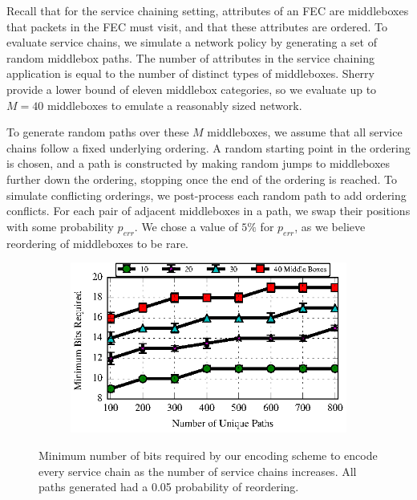 Recall that for the service chaining setting, attributes of an FEC are
middleboxes that packets in the FEC must visit, and that these
attributes are ordered. 
To evaluate service chains, we simulate a network policy by generating a
set of random middlebox paths. The number of attributes in the service
chaining application is equal to the number of distinct types of
middleboxes. Sherry \ea~\cite{Sherry:2012} provide a lower bound of eleven
middlebox categories, so we evaluate up to $M = 40$ middleboxes to
emulate a reasonably sized network.  

To generate random paths over these $M$ middleboxes, we assume that all
service chains follow a fixed underlying ordering. A random starting
point in the ordering is chosen, and a path is constructed by making
random jumps to middleboxes further down the ordering, stopping once the
end of the ordering is reached.  To simulate conflicting orderings, we
post-process each random path to add ordering conflicts. For each pair
of adjacent middleboxes in a path, we swap their positions with some
probability $p_{err}$. We chose a value of $5\%$ for $p_{err}$, as we
believe reordering of middleboxes to be rare.

\begin{figure}[t!] 
\begin{minipage}{1\linewidth}
\begin{subfigure}[b]{0.96\linewidth}
\includegraphics[width=\linewidth]{figures/service_chaining_minbits_ordered}
\end{subfigure} 
\end{minipage} 
\caption{Minimum number of bits required by our encoding scheme to
  encode every service chain as the number of service chains increases.
  All paths generated had a 0.05 probability of reordering.}
\label{fig:chain_bits}
\end{figure}

